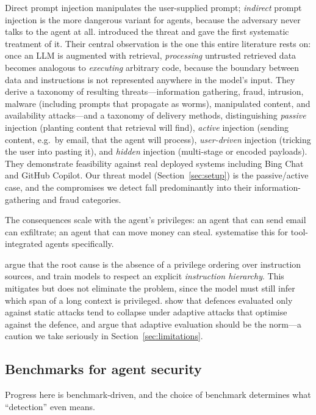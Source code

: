 \documentclass[preprint,12pt,number]{elsarticle}
\theoremstyle{definition}
\begin{document}
Direct prompt injection manipulates the user-supplied prompt; \emph{indirect}
prompt injection is the more dangerous variant for agents, because the adversary
never talks to the agent at all. \citet{greshake2023notwhat} introduced the
threat and gave the first systematic treatment of it. Their central observation
is the one this entire literature rests on: once an LLM is augmented with
retrieval, \emph{processing} untrusted retrieved data becomes analogous to
\emph{executing} arbitrary code, because the boundary between data and
instructions is not represented anywhere in the model's input. They derive a
taxonomy of resulting threats---information gathering, fraud, intrusion, malware
(including prompts that propagate as worms), manipulated content, and
availability attacks---and a taxonomy of delivery methods, distinguishing
\emph{passive} injection (planting content that retrieval will find),
\emph{active} injection (sending content, e.g.\ by email, that the agent will
process), \emph{user-driven} injection (tricking the user into pasting it), and
\emph{hidden} injection (multi-stage or encoded payloads). They demonstrate
feasibility against real deployed systems including Bing Chat and GitHub Copilot.
Our threat model (Section~\ref{sec:setup}) is the passive/active case, and the
compromises we detect fall predominantly into their information-gathering and
fraud categories.

The consequences scale with the agent's privileges: an agent that can send email
can exfiltrate; an agent that can move money can steal.
\citet{zhan2024injecagent} systematise this for tool-integrated agents
specifically.

\citet{wallace2024instructionhierarchy} argue that the root cause is the absence
of a privilege ordering over instruction sources, and train models to respect an
explicit \emph{instruction hierarchy}. This mitigates but does not eliminate the
problem, since the model must still infer which span of a long context is
privileged. \citet{nasr2025attackersecond} show that defences evaluated only
against static attacks tend to collapse under adaptive attacks that optimise
against the defence, and argue that adaptive evaluation should be the norm---a
caution we take seriously in Section~\ref{sec:limitations}.

\subsection{Benchmarks for agent security}

Progress here is benchmark-driven, and the choice of benchmark determines what
``detection'' even means.
\end{document}
